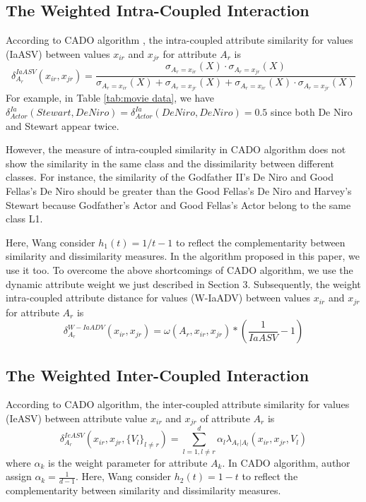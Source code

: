\documentclass[review]{elsarticle}
\begin{document}
\subsection{The Weighted Intra-Coupled Interaction}
According to CADO algorithm \cite{WangC2015CADO}, the intra-coupled attribute similarity for values (IaASV) between values $x_{ir}$ and $x_{jr}$ for attribute $A_r$ is
\begin{equation}
\delta_{A_r}^{IaASV}(x_{ir},x_{jr}) = \frac{\sigma_{A_r = x_{ir}}(X) \cdot \sigma_{A_r = x_{jr}}(X)}{\sigma_{A_r = x_{ir}}(X) + \sigma_{A_r = x_{jr}}(X) + \sigma_{A_r = x_{ir}}(X) \cdot \sigma_{A_r = x_{jr}}(X)}
\label{equ17}
\end{equation}
For example, in Table \ref{tab:movie data}, we have $\delta_{Actor}^{Ia}(Stewart,De Niro) = \delta_{Actor}^{Ia}(De Niro,De Niro) = 0.5$ since both De Niro and Stewart appear twice.

However, the measure of intra-coupled similarity in CADO algorithm does not show the similarity in the same class and the dissimilarity between different classes. For instance, the similarity of the Godfather II's De Niro and Good Fellas's De Niro should be greater than the Good Fellas's De Niro and Harvey's Stewart because Godfather's Actor and Good Fellas's Actor belong to the same class L1.

Here, Wang consider $h_1(t) = 1/t - 1$ to reflect the complementarity between similarity and dissimilarity measures. In the algorithm proposed in this paper, we use it too. To overcome the above shortcomings of CADO algorithm, we use the dynamic attribute weight we just described in Section 3. Subsequently, the weight intra-coupled attribute distance for values (W-IaADV) between values $x_{ir}$ and $x_{jr}$ for attribute $A_r$ is
\begin{equation}
\label{equ18}
\delta_{A_r}^{W-IaADV}(x_{ir},x_{jr}) = \omega(A_r,x_{ir},x_{jr}) * (\frac{1}{IaASV} - 1)
\end{equation}

\subsection{The Weighted Inter-Coupled Interaction}
According to CADO algorithm, the inter-coupled attribute similarity for values (IeASV) between attribute value $x_{ir}$ and $x_{jr}$ of attribute $A_r$ is
\begin{equation}
\delta_{A_r}^{IeASV}(x_{ir},x_{jr},\{V_l\}_{l \neq r}) = \sum_{l=1,l \neq r}^{d} \alpha_l \lambda_{A_r|A_l}(x_{ir},x_{jr},V_l)
\label{equ19}
\end{equation}
where $\alpha_k$ is the weight parameter for attribute $A_k$. In CADO algorithm, author assign $\alpha_k = \frac{1}{d-1}$. Here, Wang consider $h_2(t) = 1 - t$ to reflect the complementarity between similarity and dissimilarity measures.
\end{document}
